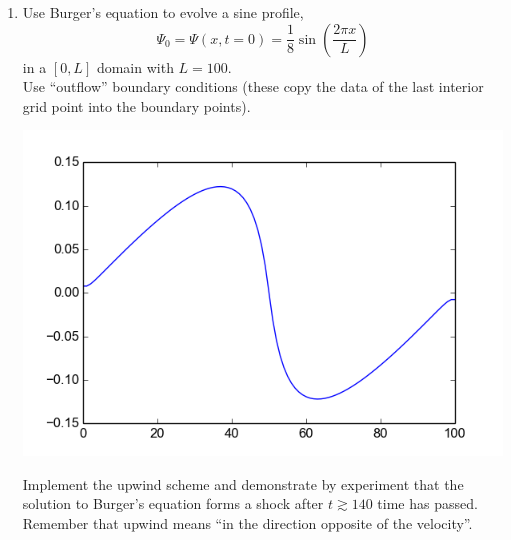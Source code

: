 \documentclass[11pt]{article}
\begin{document}
\begin{enumerate}
\item Use Burger's equation to evolve a sine profile,
\begin{equation}
\Psi_0 = \Psi(x,t=0) = \frac{1}{8} \sin \left( \frac{2\pi x}{L} \right)
\end{equation}
in a $[0,L]$ domain with $L=100$. \\
Use ``outflow'' boundary conditions  (these copy the data of the last interior grid point into the
boundary points).
\begin{center}
\begin{minipage}{0.4\textwidth}\includegraphics[width=1\textwidth]{burgers_plot.pdf}
\end{minipage}
\end{center}
\renewcommand{\labelenumi}{(\arabic{enumi})}

Implement the upwind scheme and demonstrate by experiment
that the solution to Burger's equation forms a shock after $t \gtrsim 140$
time has passed. Remember that upwind means ``in the direction opposite of the
velocity''.
  \vspace{0.1cm}


\end{enumerate}
\end{document}
